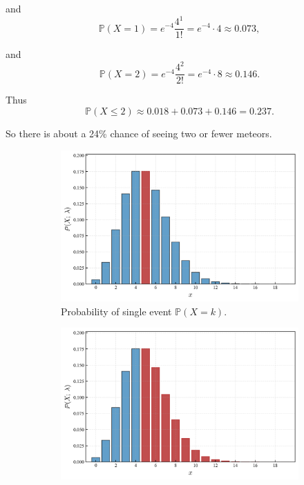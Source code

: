 \documentclass{book}
\begin{document}
and
\begin{equation}
	\mathbb{P}(X=1) = e^{-4} \frac{4^1}{1!} = e^{-4} \cdot 4 \approx 0.073,
\end{equation}

and
\begin{equation}
	\mathbb{P}(X=2) = e^{-4} \frac{4^2}{2!} = e^{-4} \cdot 8 \approx 0.146.
\end{equation}

Thus
\begin{equation}
	\mathbb{P}(X \leq 2) \approx 0.018 + 0.073 + 0.146 = 0.237.
\end{equation}

So there is about a 24\% chance of seeing two or fewer meteors.

\begin{figure}[ht]
    \centering
    \begin{subfigure}[b]{0.48\textwidth}
        \centering
        \includegraphics[width=\textwidth, height=0.7\textwidth]{figures/chapter2/poisson_1.png}
        \caption{Probability of single event $\mathbb{P} (X = k)$.}
        \label{fig:poisson1}
    \end{subfigure}
    \hfill
    \begin{subfigure}[b]{0.48\textwidth}
        \centering
        \includegraphics[width=\textwidth, height=0.7\textwidth]{figures/chapter2/poisson_1_cum.png}

\end{subfigure}
\end{figure}
\end{document}
